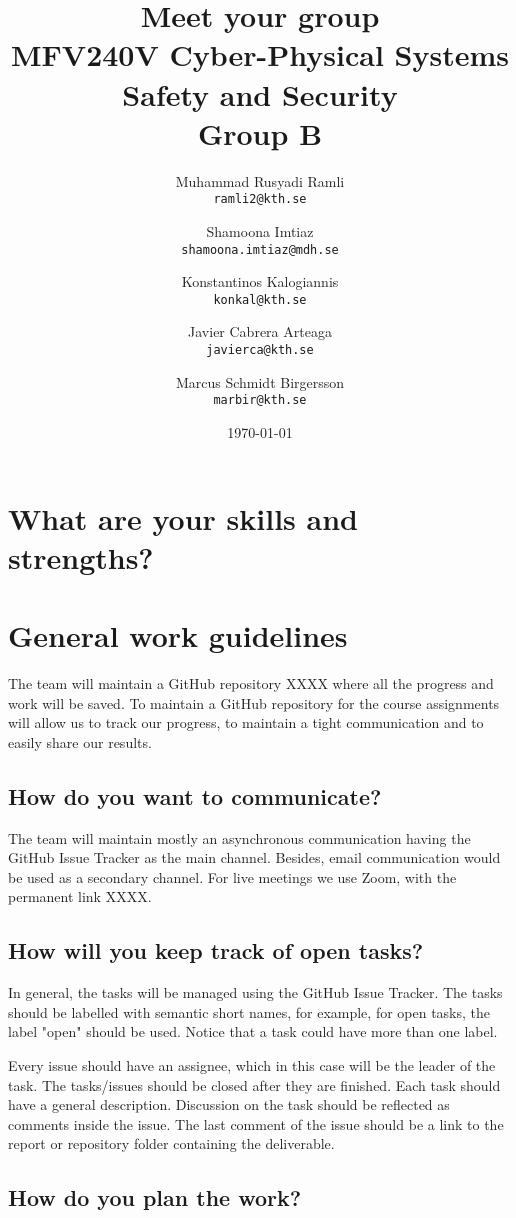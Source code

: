 \documentclass{article}
\title{Meet your group \\ \large MFV240V Cyber-Physical Systems Safety and Security \\ Group B}
\author{
  \and
  Muhammad Rusyadi Ramli\\
  \texttt{ramli2@kth.se}
  \and
  Shamoona Imtiaz\\
  \texttt{shamoona.imtiaz@mdh.se}
  \and
  Konstantinos Kalogiannis\\
  \texttt{konkal@kth.se}
  \and
  Javier Cabrera Arteaga\\
  \texttt{javierca@kth.se}
  \and
  Marcus Schmidt Birgersson\\
  \texttt{marbir@kth.se}
}
\date{\today}
\begin{document}
\maketitle

\section{What are your skills and strengths?}

\section{General work guidelines}

The team will maintain a GitHub repository XXXX where all the progress and work will be saved. To maintain a GitHub repository for the course assignments will allow us to track our progress, to maintain a tight communication and to easily share our results. 

\subsection{How do you want to communicate?}

The team will maintain mostly an asynchronous communication having the GitHub Issue Tracker as the main channel. Besides, email communication would be used as a secondary channel. For live meetings we use Zoom, with the permanent link XXXX.

\subsection{How will you keep track of open tasks?}

In general, the tasks will be managed using the GitHub Issue Tracker. The tasks should be labelled with semantic short names, for example, for open tasks, the label "open" should be used. Notice that a task could have more than one label. 

Every issue should have an assignee, which in this case will be the leader of the task. The tasks/issues should be closed after they are finished. Each task should have a general description. Discussion on the task should be reflected as comments inside the issue. The last comment of the issue should be a link to the report or repository folder containing the deliverable.


\subsection{How do you plan the work?}
\end{document}
